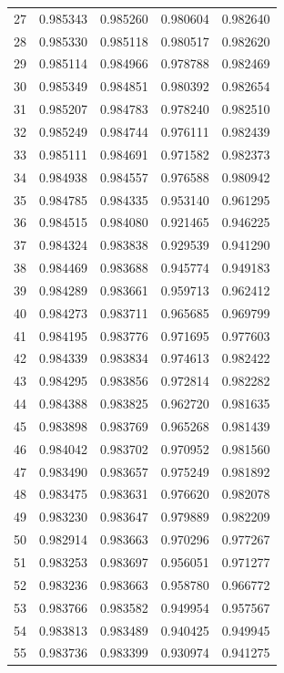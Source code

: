 \begin{table}
\begin{tabular}{rrrrr}
27 & 0.985343 & 0.985260 & 0.980604 & 0.982640 \\
28 & 0.985330 & 0.985118 & 0.980517 & 0.982620 \\
29 & 0.985114 & 0.984966 & 0.978788 & 0.982469 \\
30 & 0.985349 & 0.984851 & 0.980392 & 0.982654 \\
31 & 0.985207 & 0.984783 & 0.978240 & 0.982510 \\
32 & 0.985249 & 0.984744 & 0.976111 & 0.982439 \\
33 & 0.985111 & 0.984691 & 0.971582 & 0.982373 \\
34 & 0.984938 & 0.984557 & 0.976588 & 0.980942 \\
35 & 0.984785 & 0.984335 & 0.953140 & 0.961295 \\
36 & 0.984515 & 0.984080 & 0.921465 & 0.946225 \\
37 & 0.984324 & 0.983838 & 0.929539 & 0.941290 \\
38 & 0.984469 & 0.983688 & 0.945774 & 0.949183 \\
39 & 0.984289 & 0.983661 & 0.959713 & 0.962412 \\
40 & 0.984273 & 0.983711 & 0.965685 & 0.969799 \\
41 & 0.984195 & 0.983776 & 0.971695 & 0.977603 \\
42 & 0.984339 & 0.983834 & 0.974613 & 0.982422 \\
43 & 0.984295 & 0.983856 & 0.972814 & 0.982282 \\
44 & 0.984388 & 0.983825 & 0.962720 & 0.981635 \\
45 & 0.983898 & 0.983769 & 0.965268 & 0.981439 \\
46 & 0.984042 & 0.983702 & 0.970952 & 0.981560 \\
47 & 0.983490 & 0.983657 & 0.975249 & 0.981892 \\
48 & 0.983475 & 0.983631 & 0.976620 & 0.982078 \\
49 & 0.983230 & 0.983647 & 0.979889 & 0.982209 \\
50 & 0.982914 & 0.983663 & 0.970296 & 0.977267 \\
51 & 0.983253 & 0.983697 & 0.956051 & 0.971277 \\
52 & 0.983236 & 0.983663 & 0.958780 & 0.966772 \\
53 & 0.983766 & 0.983582 & 0.949954 & 0.957567 \\
54 & 0.983813 & 0.983489 & 0.940425 & 0.949945 \\
55 & 0.983736 & 0.983399 & 0.930974 & 0.941275 \\

\end{tabular}
\end{table}
